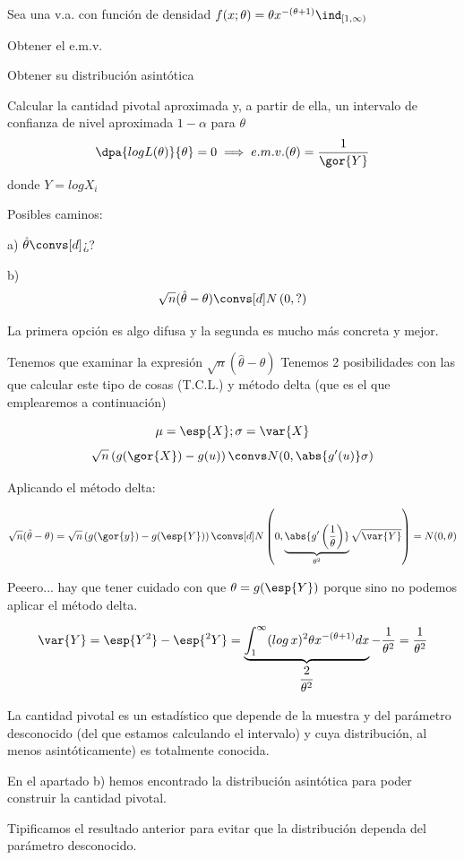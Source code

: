 \begin{problem}[5] Sea una v.a. con función de densidad $f(x;\theta) = \theta x^{-(\theta + 1)}\ind_{[1,\infty)} $

\ppart Obtener el e.m.v.

\ppart Obtener su distribución asintótica

\ppart Calcular la cantidad pivotal aproximada y, a partir de ella, un intervalo de confianza de nivel aproximada $1-\alpha$ para $\theta$
\solution
\spart \[\dpa{logL(\theta)}{\theta} = 0 \implies e.m.v.(\theta) = \frac{1}{\gor{Y}}\]
donde $Y = log X_i$

\spart Posibles caminos:

a) $\hat{\theta} \convs[d] $¿?

b) \[\sqrt{n}(\hat{\theta} - \theta) \convs[d] N\left(0,?\right)\]

La primera opción es algo difusa y la segunda es mucho más concreta y mejor.

Tenemos que examinar la expresión $\sqrt{n}(\hat{\theta} - \theta)$
Tenemos 2 posibilidades con las que calcular este tipo de cosas (T.C.L.) y método delta (que es el que emplearemos a continuación)

\[ \mu = \esp{X}; \sigma = \var{X} \]
\[ \sqrt{n}\left(g(\gor{X}) - g(u)\right) \convs N(0,\abs{g'(u)} \sigma) \]

Aplicando el método delta:

\[
\sqrt{n}(\hat{\theta} - \theta) = \sqrt{ n}\left(g(\gor{y})-g(\esp{Y})\right)\convs[d] N\left(0,\underbrace{\abs{g'\left(\frac{1}{\theta}\right)}}_{\theta^2} \sqrt{\var{Y}}\right) = N(0,\theta)
\]

Peeero... hay que tener cuidado con que $\theta = g(\esp{Y})$ porque sino no podemos aplicar el método delta.

\[
\var{Y} = \esp{Y^2} - \esp{^2 Y} = \underbrace{\int_1^{\infty} (log\,x)^2 \theta x^{-(\theta + 1)}dx}_{\displaystyle\frac{2}{\theta^2}} - \frac{1}{\theta^2} = \frac{1}{\theta^2}
\]

\spart
La cantidad pivotal es un estadístico que depende de la muestra y del parámetro desconocido (del que estamos calculando el intervalo) y cuya distribución, al menos asintóticamente) es totalmente conocida.

En el apartado b) hemos encontrado la distribución asintótica para poder construir la cantidad pivotal.

Tipificamos el resultado anterior para evitar que la distribución dependa del parámetro desconocido.


\end{problem}
